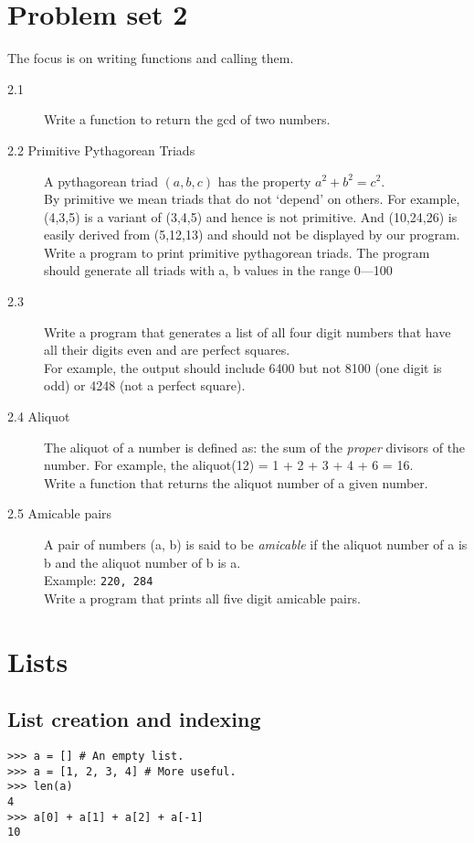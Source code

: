 \documentclass[12pt]{article}
\begin{document}
\section{Problem set 2}
  The focus is on writing functions and calling them.
\begin{description}
  \item[2.1] Write a function to return the gcd of two numbers.
  \item[2.2 Primitive Pythagorean Triads] A pythagorean triad $(a,b,c)$ has the property $a^2 + b^2 = c^2$.\\By primitive we mean triads that do not `depend' on others. For example, (4,3,5) is a variant of (3,4,5) and hence is not primitive. And (10,24,26) is easily derived from (5,12,13) and should not be displayed by our program. \\
Write a program to print primitive pythagorean triads. The program should generate all triads with a, b values in the range 0---100
\item[2.3] Write a program that generates a list of all four digit numbers that have all their digits even and are perfect squares.\\For example, the output should include 6400 but not 8100 (one digit is odd) or 4248 (not a perfect square).
\item[2.4 Aliquot] The aliquot of a number is defined as: the sum of the \emph{proper} divisors of the number. For example, the aliquot(12) = 1 + 2 + 3 + 4 + 6 = 16.\\
  Write a function that returns the aliquot number of a given number. 
\item[2.5 Amicable pairs] A pair of numbers (a, b) is said to be \emph{amicable} if the aliquot number of a is b and the aliquot number of b is a.\\
  Example: \texttt{220, 284}\\
  Write a program that prints all five digit amicable pairs.
\end{description}

\section{Lists}
\subsection{List creation and indexing}
\begin{verbatim}
>>> a = [] # An empty list.
>>> a = [1, 2, 3, 4] # More useful.
>>> len(a) 
4
>>> a[0] + a[1] + a[2] + a[-1]
10
\end{verbatim}
\end{document}
